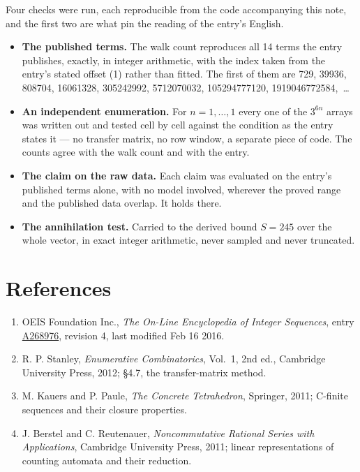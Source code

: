 \documentclass[11pt]{article}
\theoremstyle{definition}
\begin{document}
Four checks were run, each reproducible from the code accompanying this note, and the first two are what pin the reading of the entry's English.

\begin{itemize}

\item {\bfseries The published terms.} The walk count reproduces all 14 terms the entry publishes, exactly, in integer arithmetic, with the index taken from the entry's stated offset (1) rather than fitted. The first of them are 729, 39936, 808704, 16061328, 305242992, 5712070032, 105294777120, 1919046772584,~\dots

\item {\bfseries An independent enumeration.} For $n = 1,\dots,1$ every one of the $3^{6n}$ arrays was written out and tested cell by cell against the condition as the entry states it --- no transfer matrix, no row window, a separate piece of code. The counts agree with the walk count and with the entry.

\item {\bfseries The claim on the raw data.} Each claim was evaluated on the entry's published terms alone, with no model involved, wherever the proved range and the published data overlap. It holds there.

\item {\bfseries The annihilation test.} Carried to the derived bound $S = 245$ over the whole vector, in exact integer arithmetic, never sampled and never truncated.

\end{itemize}

\section{References}

\begin{enumerate}

\item OEIS Foundation Inc., \emph{The On-Line Encyclopedia of Integer Sequences}, entry \href{https://oeis.org/A268976}{A268976}, revision 4, last modified Feb 16 2016.

\item R. P. Stanley, \emph{Enumerative Combinatorics}, Vol.~1, 2nd ed., Cambridge University Press, 2012; \S4.7, the transfer-matrix method.

\item M. Kauers and P. Paule, \emph{The Concrete Tetrahedron}, Springer, 2011; C-finite sequences and their closure properties.

\item J. Berstel and C. Reutenauer, \emph{Noncommutative Rational Series with Applications}, Cambridge University Press, 2011; linear representations of counting automata and their reduction.

\end{enumerate}
\end{document}
